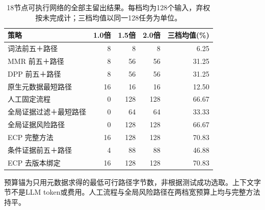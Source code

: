 \begin{table}[t]
\caption{18节点可执行网络的全部主留出结果。每档均为128个输入，弃权按未完成计；三档均值以同一128任务为单位。}\label{tab:network-main}
\centering\small
\begin{tabularx}{\textwidth}{Xrrrr}
\toprule
策略 & 1.0倍 & 1.5倍 & 2.0倍 & 三档均值(\%) \\
\midrule
词法前五＋路径 & 8 & 8 & 8 & 6.25 \\
MMR 前五＋路径 & 8 & 56 & 56 & 31.25 \\
DPP 前五＋路径 & 8 & 56 & 56 & 31.25 \\
原生元数据最短路径 & 16 & 16 & 16 & 12.50 \\
人工固定流程 & 0 & 128 & 128 & 66.67 \\
全局证据过滤＋最短路径 & 0 & 64 & 64 & 33.33 \\
全局证据风险路径 & 0 & 128 & 128 & 66.67 \\
ECP 完整方法 & 16 & 128 & 128 & 70.83 \\
条件证据前五＋路径 & 4 & 88 & 88 & 46.88 \\
ECP 去版本绑定 & 16 & 128 & 128 & 70.83 \\
\bottomrule
\end{tabularx}
\par\vspace{3pt}\raggedright\footnotesize 预算锚为只用元数据求得的最低可行路径字节数，非根据测试成功选取。上下文字节不是LLM token或费用。人工流程与全局风险路径在两档宽预算上均与完整方法持平。
\end{table}
